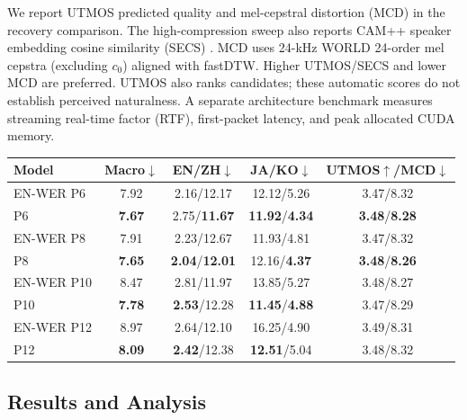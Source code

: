 \documentclass{article}
\begin{document}
We report UTMOS predicted quality \cite{saeki2022utmos} and
mel-cepstral distortion (MCD) in the recovery comparison. The
high-compression sweep also reports CAM++ speaker embedding cosine
similarity (SECS) \cite{wang2023campp}. MCD uses 24-kHz WORLD
24-order mel cepstra (excluding $c_0$) aligned with fastDTW.
Higher UTMOS/SECS and lower MCD are preferred. UTMOS also ranks candidates; these automatic scores do not establish perceived naturalness.
A separate architecture benchmark measures
streaming real-time factor (RTF), first-packet latency, and peak allocated CUDA memory.

\par\smallskip
\noindent\begin{minipage}{\columnwidth}
\centering
{}
\label{tab:criterion_comparison}
\small
\setlength{\tabcolsep}{1.0pt}
\renewcommand{\arraystretch}{1.05}
\begin{tabular}{lcccc}
\toprule
\textbf{Model} &
\textbf{Macro$\downarrow$} &
\textbf{EN/ZH$\downarrow$} &
\textbf{JA/KO$\downarrow$} &
\textbf{UTMOS$\uparrow$/MCD$\downarrow$} \\
\midrule
EN-WER P6 & 7.92 & 2.16/12.17 & 12.12/5.26 & 3.47/8.32 \\
P6 & \textbf{7.67} & 2.75/\textbf{11.67} & \textbf{11.92}/\textbf{4.34} & \textbf{3.48}/\textbf{8.28} \\
EN-WER P8 & 7.91 & 2.23/12.67 & 11.93/4.81 & 3.47/8.32 \\
P8 & \textbf{7.65} & \textbf{2.04}/\textbf{12.01} & 12.16/\textbf{4.37} & \textbf{3.48}/\textbf{8.26} \\
EN-WER P10 & 8.47 & 2.81/11.97 & 13.85/5.27 & 3.48/8.27 \\
P10 & \textbf{7.78} & \textbf{2.53}/12.28 & \textbf{11.45}/\textbf{4.88} & 3.47/8.29 \\
EN-WER P12 & 8.97 & 2.64/12.10 & 16.25/4.90 & 3.49/8.31 \\
P12 & \textbf{8.09} & \textbf{2.42}/12.38 & \textbf{12.51}/5.04 & 3.48/8.32 \\
\bottomrule
\end{tabular}%
\end{minipage}\par\smallskip

\subsection{Results and Analysis}
\label{sec:results}
\end{document}

